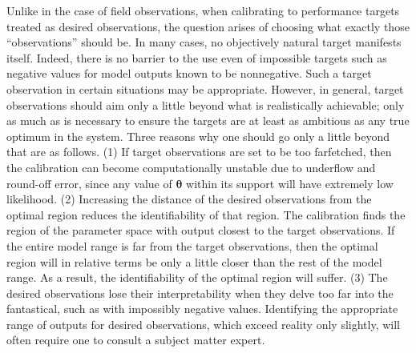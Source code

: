 \documentclass[12pt]{article}
\begin{document}


Unlike in the case of field observations, when calibrating to performance targets treated as desired observations, the question arises of choosing what exactly those ``observations'' should be.
%
In many cases, no objectively natural target manifests itself. 
%
Indeed, there is no barrier to the use even of impossible targets such as negative values for model outputs known to be nonnegative.
%
Such a target observation in certain situations may be appropriate. 
%
However, in general, target observations should aim only a little beyond what is realistically achievable; only as much as is necessary to ensure the targets are at least as ambitious as any true optimum in the system.
%
Three reasons why one should go only a little beyond that are as follows. 
%
(1) If target observations are set to be too farfetched, then the calibration can become computationally unstable due  to underflow and round-off error, since any value of $\boldsymbol \theta$ within its support will have extremely low likelihood.
%
(2) Increasing the distance of the desired observations from the optimal region reduces the identifiability of that region.
%
The calibration finds the region of the parameter space with output closest to the target observations.
%
If the entire model range is far from the target observations, then the optimal region will in relative terms be only a little closer than the rest of the model range. 
% 
As a result, the identifiability of the optimal region will suffer.
%
%
(3) The desired observations lose their interpretability when they delve too far into the fantastical, such as with impossibly negative values. 
%
Identifying the appropriate range of outputs for desired observations, which exceed reality only slightly, will often require one to consult a subject matter expert. 
\end{document}
